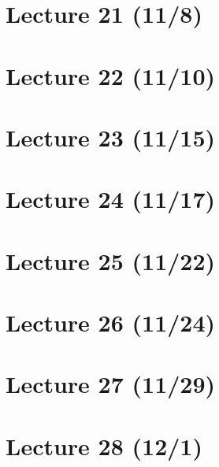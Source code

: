 \documentclass{book}
\theoremstyle{plain}
\begin{document}
    \chapter{Lecture 21 (11/8)}

    \chapter{Lecture 22 (11/10)}

    \chapter{Lecture 23 (11/15)}

    \chapter{Lecture 24 (11/17)}

    \chapter{Lecture 25 (11/22)}

    \chapter{Lecture 26 (11/24)}

    \chapter{Lecture 27 (11/29)}

    \chapter{Lecture 28 (12/1)}
\end{document}
